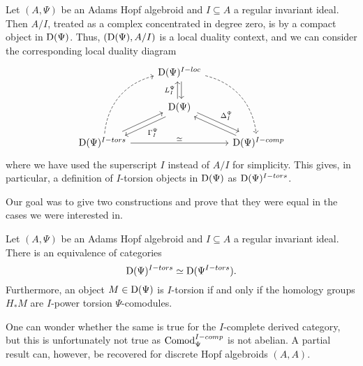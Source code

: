 \begin{construction}
    \label{ch0:const:local-duality-hopf-algebroid}
    Let $(A, \Psi)$ be an Adams Hopf algebroid and $I\subseteq A$ a regular invariant ideal. Then $A/I$, treated as a complex concentrated in degree zero, is by \cite[5.13]{barthel-heard-valenzuela_2018} a compact object in $\mathrm{D}(\Psi)$. Thus, $(\mathrm{D}(\Psi), A/I)$ is a local duality context, and we can consider the corresponding local duality diagram
    \begin{equation*}
        \begin{tikzcd}
            & {\Der(\Psi)^{I-loc}} \\
            & {\Der(\Psi)} \\
            {\Der(\Psi)^{I-tors}} && {\Der(\Psi)^{I-comp}}
            \arrow["L_I^\Psi", xshift=-2pt, from=2-2, to=1-2]
            \arrow[xshift=2pt, from=1-2, to=2-2]
            \arrow["\Delta_I^\Psi", yshift=2pt, xshift=2pt, from=2-2, to=3-3]
            \arrow[yshift=-2pt, xshift=-1pt, from=3-3, to=2-2]
            \arrow["\Gamma^\Psi_I", yshift=-2pt, xshift=2pt, from=2-2, to=3-1]
            \arrow[yshift=2pt, xshift=-1pt, from=3-1, to=2-2]
            \arrow[bend left=35, dashed, from=3-1, to=1-2]
            \arrow[bend left=35, dashed, from=1-2, to=3-3]
            \arrow["\simeq"', swap, from=3-1, to=3-3]
        \end{tikzcd}    
    \end{equation*}
    where we have used the superscript $I$ instead of $A/I$ for simplicity. This gives, in particular, a definition of $I$-torsion objects in $\mathrm{D}(\Psi)$ as $\mathrm{D}(\Psi)^{I-tors}$. 
\end{construction}

Our goal was to give two constructions and prove that they were equal in the cases we were interested in. 

\begin{lemma}
    \label{ch0:lm:derived-torsion-if-homology-torsion}
    Let $(A,\Psi)$ be an Adams Hopf algebroid and $I\subseteq A$ a regular invariant ideal. There is an equivalence of categories 
    \[\mathrm{D}(\Psi)^{I-tors}\simeq \mathrm{D}(\Psi^{I-tors}).\] 
    Furthermore, an object $M\in \mathrm{D}(\Psi)$ is $I$-torsion if and only if the homology groups $H_* M$ are $I$-power torsion $\Psi$-comodules.
\end{lemma}

\begin{remark}
    \label{ch0:rm:right-completed-derived-category}
    One can wonder whether the same is true for the $I$-complete derived category, but this is unfortunately not true as $\mathrm{Comod}_\Psi^{I-comp}$ is not abelian. A partial result can, however, be recovered for discrete Hopf algebroids $(A, A)$. 
\end{remark}

